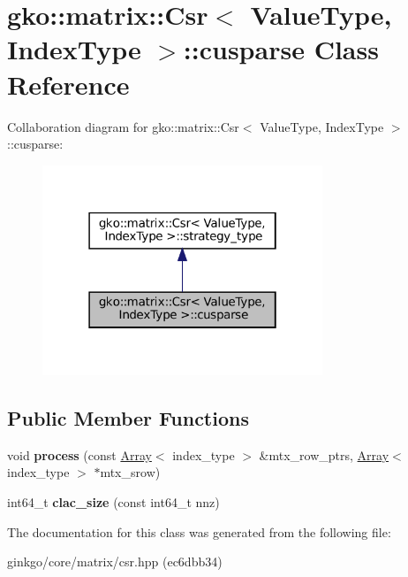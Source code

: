 \hypertarget{classgko_1_1matrix_1_1Csr_1_1cusparse}{}\section{gko\+:\+:matrix\+:\+:Csr$<$ Value\+Type, Index\+Type $>$\+:\+:cusparse Class Reference}
\label{classgko_1_1matrix_1_1Csr_1_1cusparse}


Collaboration diagram for gko\+:\+:matrix\+:\+:Csr$<$ Value\+Type, Index\+Type $>$\+:\+:cusparse\+:
\nopagebreak
\begin{figure}[H]
\begin{center}
\leavevmode
\includegraphics[width=238pt]{classgko_1_1matrix_1_1Csr_1_1cusparse__coll__graph}
\end{center}
\end{figure}
\subsection*{Public Member Functions}
\begin{DoxyCompactItemize}
\item 
\mbox{\label{classgko_1_1matrix_1_1Csr_1_1cusparse_ad913d7450cec714fda555ac1a0c781bc}} 
void {\bfseries process} (const \hyperlink{classgko_1_1Array}{Array}$<$ index\+\_\+type $>$ \&mtx\+\_\+row\+\_\+ptrs, \hyperlink{classgko_1_1Array}{Array}$<$ index\+\_\+type $>$ $\ast$mtx\+\_\+srow)
\item 
\mbox{\label{classgko_1_1matrix_1_1Csr_1_1cusparse_a3a11fb0655b828fb590a87f5f83e9373}} 
int64\+\_\+t {\bfseries clac\+\_\+size} (const int64\+\_\+t nnz)
\end{DoxyCompactItemize}


The documentation for this class was generated from the following file\+:\begin{DoxyCompactItemize}
\item 
ginkgo/core/matrix/csr.\+hpp (ec6dbb34)\end{DoxyCompactItemize}
